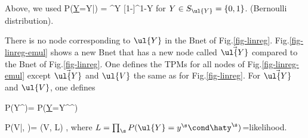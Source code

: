 Above, we used
\beq
P(\ul{Y}=Y|\haty) = \haty^{Y}
[1-\haty]^{1-Y}
\eeq
for $Y\in S_{\ul{Y}}=\{0,1\}$. (Bernoulli distribution).

There is no node corresponding to $\ul{Y}$
in the Bnet of Fig.\ref{fig-linreg}.
Fig.\ref{fig-linreg-emul} shows a new Bnet
that has a new node called $\vec{\ul{Y}}$
compared to the Bnet of Fig.\ref{fig-linreg}.
One defines the TPMs
for all nodes of Fig.\ref{fig-linreg-emul}
except $\vec{\ul{Y}}$ and $\ul{V}$ the same
as for Fig.\ref{fig-linreg}. For $\vec{\ul{Y}}$
and $\ul{V}$, one defines

\beq\color{blue}
P(Y^\s\cond \vec{\haty})=
P(\ul{Y}=Y^\s\cond \haty^\s)
\eeq

\beq\color{blue}
P(V|, \vecy)=
\delta(V, \ln  L)
\;,
\eeq
where $ L =\prod_\s P(\ul{Y}=y^\s\cond \haty^\s )$=likelihood.
